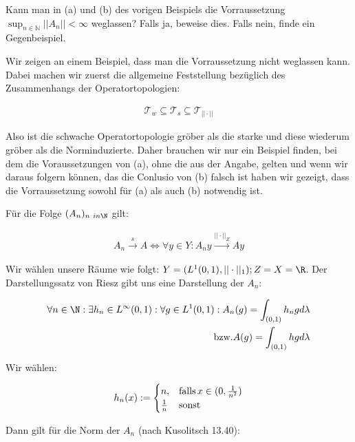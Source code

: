 \begin{exercise}
Kann man in (a) und (b) des vorigen Beispiels die Vorraussetzung
$\sup_{n \in \mathbb{N}} ||A_n|| < \infty$ weglassen?
Falls ja, beweise dies. Falls nein, finde ein Gegenbeispiel.
\end{exercise}
\begin{solution}

Wir zeigen an einem Beispiel, dass man die Vorraussetzung nicht weglassen kann.
Dabei machen wir zuerst die allgemeine Feststellung bezüglich des Zusammenhangs der
Operatortopologien:

\begin{align*}
  \mathcal{T}_w \subseteq \mathcal{T}_s \subseteq \mathcal{T}_{||\cdot||}
\end{align*}

Also ist die schwache Operatortopologie gröber als die starke und diese wiederum
gröber als die Norminduzierte. Daher brauchen wir nur ein Beispiel finden, bei dem
die Voraussetzungen von (a), ohne die aus der Angabe, gelten und wenn wir daraus folgern können, das die Conlusio von (b) falsch ist haben wir gezeigt, dass die Vorraussetzung sowohl
für (a) als auch (b) notwendig ist.

Für die Folge $(A_n)_{n \ in \N}$ gilt:

\begin{align*}
  A_n \stackrel{s}{\rightarrow} A
  \Leftrightarrow
  \forall y \in Y: A_n y \stackrel{||\cdot||_Z}{\rightarrow} Ay
\end{align*}

Wir wählen unsere Räume wie folgt: $Y = (L^1 (0,1), ||\cdot||_1) ; Z=X=\R$. Der
Darstellungssatz von Riesz gibt uns eine Darstellung der $A_n$:

\begin{align*}
  \forall n \in \N: \exists h_n \in L^{\infty}(0,1):
  \forall g \in L^1 (0,1): A_n(g) = \int_{(0,1)}h_n g d\lambda \\
  \text{bzw.} A(g)= \int_{(0,1)} hg d\lambda
\end{align*}

Wir wählen:

\begin{align*}
  h_n (x):= \begin{cases}
    n, & \text{falls\,} x \in (0,\frac{1}{n^2}) \\
    \frac{1}{n} & \text{sonst}
  \end{cases}
\end{align*}

Dann gilt für die Norm der $A_n$ (nach Kusolitsch 13.40):


\end{solution}

